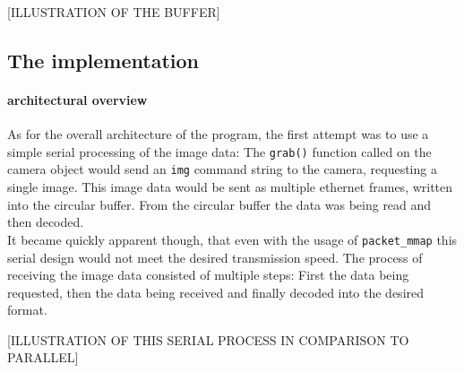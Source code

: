 
[ILLUSTRATION OF THE BUFFER]

\subsection{The implementation}
\label{sec:architecture}

\paragraph{architectural overview}

As for the overall architecture of the program, the first attempt was to use a simple serial processing of the image data: The \texttt{grab()} function called on the camera object would send an \texttt{img} command string to the camera, requesting a single image. This image data would be sent as multiple ethernet frames, written into the circular buffer. From the circular buffer the data was being read and then decoded.\\
It became quickly apparent though, that even with the usage of \texttt{packet\_mmap} this serial design would not meet the desired transmission speed. The process of receiving the image data consisted of multiple steps: First the data being requested, then the data being received and finally decoded into the desired format.

[ILLUSTRATION OF THIS SERIAL PROCESS IN COMPARISON TO PARALLEL]

